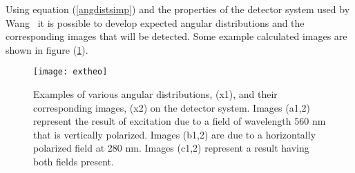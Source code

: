 Using equation (\ref{angdistsimp}) and the properties of the
detector system used by Wang~\cite{Wang0} it is possible to
develop expected angular distributions and the corresponding
images that will be detected.  Some example calculated images are
shown in figure (\ref{extheo}).

\begin{figure}
\texttt{[image: extheo]}
\caption[Example theoretical angular distributions and
images]{Examples of various angular distributions, (x1), and their
corresponding images, (x2) on the detector system.  Images (a1,2)
represent the result of excitation due to a field of wavelength
560 nm that is vertically polarized.  Images (b1,2) are due to a
horizontally polarized field at 280 nm.  Images (c1,2) represent a
result having both fields present.} \label{extheo}
\end{figure}
